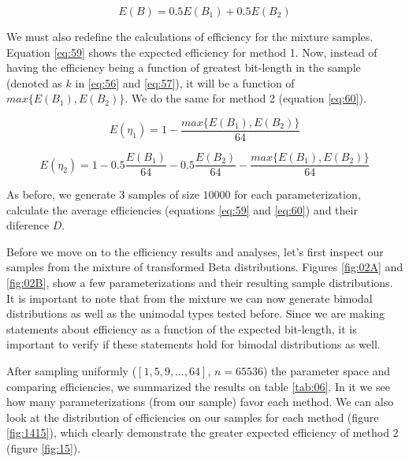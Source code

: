 \documentclass[10pt]{article}
\begin{document}
\begin{equation}\label{eq:58}
 E(B) = 0.5 E(B_1) + 0.5 E(B_2)
\end{equation}
 
We must also redefine the calculations of efficiency for the mixture samples. Equation \ref{eq:59} shows the expected efficiency for method 1. Now, instead of having the efficiency being a function of greatest bit-length in the sample (denoted as  $k$ in \ref{eq:56} and \ref{eq:57}), it will be a function of $max\{E(B_1),E(B_2)\}$. We do the same for method​ 2 (equation \ref{eq:60})​. 

\begin{equation}\label{eq:59}
 E(\eta_1) = 1 - \frac{max\{E(B_1),E(B_2)\}}{64}
\end{equation}

\begin{equation}\label{eq:60}
 E(\eta_2) = 1 - 0.5\frac{E(B_1)}{64} - 0.5\frac{E(B_2)}{64} - \frac{max\{E(B_1),E(B_2)\}}{64}
\end{equation}
 
As before, we generate 3 samples of size $10000$ for each parameterization, calculate the average efficiencies (equations \ref{eq:59} and \ref{eq:60}) and their diference $D$.

Before we move on to the efficiency results and analyses, let's first inspect our samples from the mixture of transformed Beta distributions. Figures \ref{fig:02A} and \ref{fig:02B}, show a few parameterizations and their resulting sample distributions. It is important to note that from the mixture we can now generate bimodal distributions as well as the unimodal types tested before. Since we are making statements about efficiency as a function of the expected bit-length, it is important to verify if these statements hold for bimodal  distributions as well.

After sampling uniformly ($[1,5,9,\ldots,64]$, $n=65536$) the parameter space and comparing efficiencies, we summarized the results on table \ref{tab:06}. In it we see how many parameterizations (from our sample) favor each method. We can also look at the distribution of efficiencies on our samples for each method (figure \ref{fig:1415}), which clearly demonstrate the greater expected efficiency of method 2 (figure \ref{fig:15}).
\end{document}
